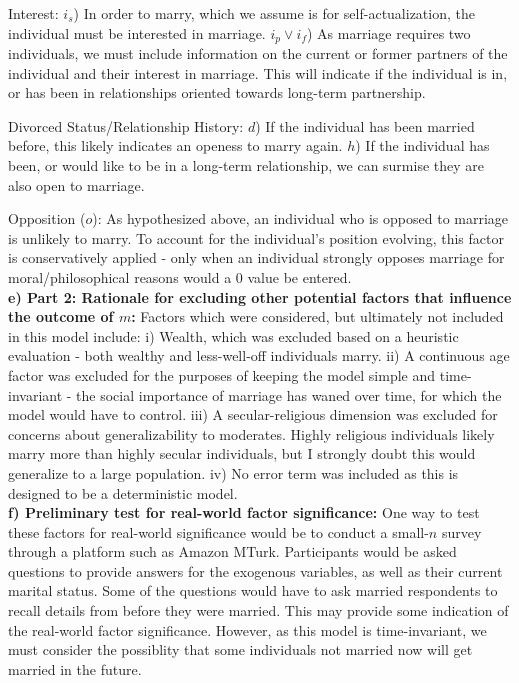 \documentclass{report}
\begin{document}
Interest: $i_s$) In order to marry, which we assume is for self-actualization, the individual must be interested in marriage. $i_p \vee i_f$) As marriage requires two individuals, we must include information on the current or former partners of the individual and their interest in marriage. This will indicate if the individual is in, or has been in relationships oriented towards long-term partnership.

Divorced Status/Relationship History: $d$) If the individual has been married before, this likely indicates an openess to marry again. $h$) If the individual has been, or would like to be in a long-term relationship, we can surmise they are also open to marriage. 

Opposition ($o$): As hypothesized above, an individual who is opposed to marriage is unlikely to marry. To account for the individual's position evolving, this factor is conservatively applied - only when an individual strongly opposes marriage for moral/philosophical reasons would a $0$ value be entered. \\

\textbf{e) Part 2: Rationale for excluding other potential factors that influence the outcome of $m$:} Factors which were considered, but ultimately not included in this model include: i) Wealth, which was excluded based on a heuristic evaluation - both wealthy and less-well-off individuals marry. ii) A continuous age factor was excluded for the purposes of keeping the model simple  and time-invariant - the social importance of marriage has waned over time, for which the model would have to control. iii) A secular-religious dimension was excluded for concerns about generalizability to moderates. Highly religious individuals likely marry more than highly secular individuals, but I strongly doubt this would generalize to a large population. iv) No error term was included as this is designed to be a deterministic model. \\

\textbf{f) Preliminary test for real-world factor significance:} One way to test these factors for real-world significance would be to conduct a small-$n$ survey through a platform such as Amazon MTurk. Participants would be asked questions to provide answers for the exogenous variables, as well as their current marital status. Some of the questions would have to ask married respondents to recall details from before they were married. This may provide some indication of the real-world factor significance. However, as this model is time-invariant, we must consider the possiblity that some individuals not married now will get married in the future. 
\end{document}
